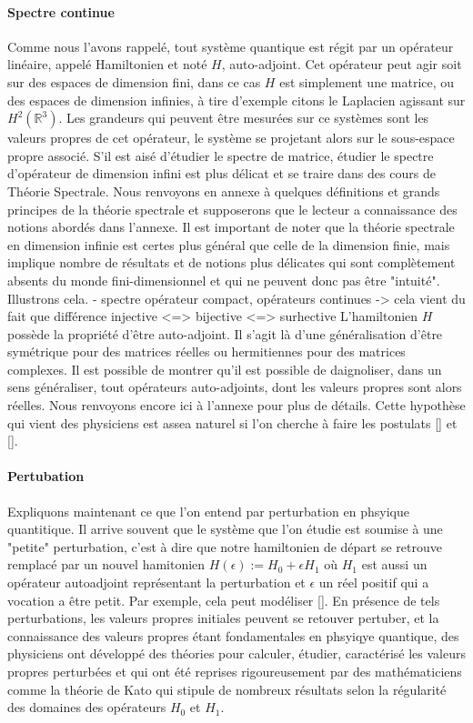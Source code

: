 \documentclass[12pt,openany,a4paper, titlepage]{article}
\newcommand{\R}{\mathbb{R}}
\theoremstyle{definition}
\theoremstyle{definition}
\theoremstyle{definition}
\theoremstyle{definition}
\theoremstyle{definition}
\theoremstyle{definition}
\begin{document}
\paragraph{Spectre continue}
Comme nous l'avons rappelé, tout système quantique est régit par un opérateur linéaire, appelé Hamiltonien et noté $H$, auto-adjoint. Cet opérateur peut agir soit sur des espaces  de dimension fini, dans ce cas $H$ est simplement une matrice, ou des espaces de dimension infinies, à tire d'exemple citons le Laplacien agissant sur $H^2(\R^3)$. Les grandeurs qui peuvent être mesurées sur ce systèmes sont les valeurs propres de cet opérateur, le système se projetant alors sur le sous-espace propre associé. S'il est aisé d'étudier le spectre de matrice, étudier le spectre d'opérateur de dimension infini est plus délicat et se traire dans des cours de Théorie Spectrale. Nous renvoyons en annexe à quelques définitions et grands principes de la théorie spectrale et supposerons que le lecteur a connaissance des notions abordés dans l'annexe. Il est important de noter que la théorie spectrale en dimension infinie est certes plus général que celle de la dimension finie, mais implique nombre de résultats et de notions plus délicates qui sont complètement absents du monde fini-dimensionnel et qui ne peuvent donc pas être "intuité". Illustrons cela.
- spectre opérateur compact, opérateurs continues -> cela vient du fait que différence injective <=> bijective <=> surhective
L'hamiltonien $H$ possède la propriété d'être auto-adjoint. Il s'agit là d'une généralisation d'être symétrique pour des matrices réelles ou hermitiennes pour des matrices complexes. Il est possible de montrer qu'il est possible de daignoliser, dans un sens généraliser, tout opérateurs auto-adjoints, dont les valeurs propres sont alors réelles. Nous renvoyons encore ici à l'annexe pour plus de détails. Cette hypothèse qui vient des physiciens est assea naturel si l'on cherche à faire les postulats [] et [].

\paragraph{Pertubation}
Expliquons maintenant ce que l'on entend par perturbation en phsyique quantitique. Il arrive souvent que le système que l'on étudie est soumise à une "petite" perturbation, c'est à dire que notre hamiltonien de départ se retrouve remplacé par un nouvel hamitonien $H(\epsilon) := H_0 + \epsilon H_1$ où $H_1$ est aussi un opérateur autoadjoint représentant la perturbation et $\epsilon$ un réel positif qui a vocation a être petit.  Par exemple, cela peut modéliser []. En présence de tels perturbations, les valeurs propres initiales peuvent se retouver pertuber, et la connaissance des valeurs propres étant fondamentales en phsyiqye quantique, des physiciens ont développé des théories pour calculer, étudier, caractérisé les valeurs propres perturbées et qui ont été reprises rigoureusement par des mathématiciens comme la théorie de Kato qui stipule de nombreux résultats selon la régularité des domaines des opérateurs $H_0$ et $H_1$. 
\end{document}
